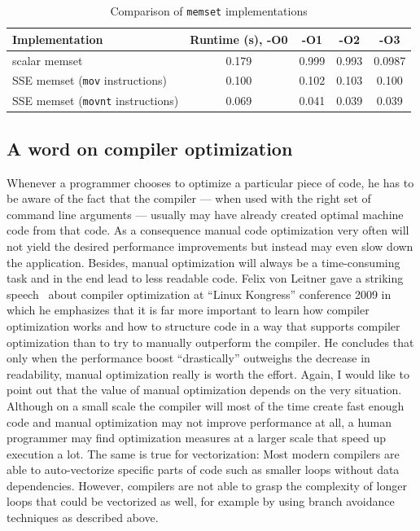 \begin{table}[h]
\begin{center}
\caption{Comparison of \texttt{memset} implementations}
\begin{tabular}{lcccc}
\toprule
Implementation & Runtime (s), -O0 & -O1 & -O2 & -O3 \\
\midrule
scalar memset & 0.179 & 0.999 & 0.993 & 0.0987 \\
SSE memset (\texttt{mov} instructions) & 0.100 & 0.102 & 0.103 & 0.100 \\
SSE memset (\texttt{movnt} instructions) & 0.069 & 0.041 & 0.039 & 0.039 \\
\bottomrule
\end{tabular}
\label{memset_table}
\end{center}
\end{table}

\subsection{A word on compiler optimization}
Whenever a programmer chooses to optimize a particular piece of code, he has to be aware of the fact that the compiler --- when used with the right set of command line arguments --- usually may have already created optimal machine code from that code. As a consequence manual code optimization very often will not yield the desired performance improvements but instead may even slow down the application. Besides, manual optimization will always be a time-consuming task and in the end lead to less readable code. Felix von Leitner gave a striking speech~\cite{leitner2009} about compiler optimization at ``Linux Kongress'' conference 2009 in which he emphasizes that it is far more important to learn how compiler optimization works and how to structure code in a way that supports compiler optimization than to try to manually outperform the compiler. He concludes that only when the performance boost ``drastically'' outweighs the decrease in readability, manual optimization really is worth the effort. Again, I would like to point out that the value of manual optimization depends on the very situation. Although on a small scale the compiler will most of the time create fast enough code and manual optimization may not improve performance at all, a human programmer may find optimization measures at a larger scale that speed up execution a lot. The same is true for vectorization: Most modern compilers are able to auto-vectorize specific parts of code such as smaller loops without data dependencies. However, compilers are not able to grasp the complexity of longer loops that could be vectorized as well, for example by using branch avoidance techniques as described above.
